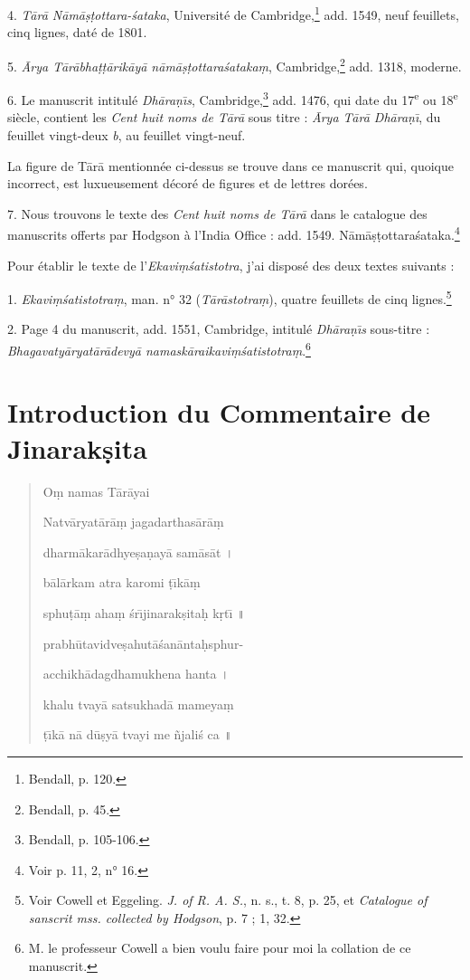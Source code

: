 \documentclass[a4paper, 11pt, oneside, french, landscape, twocolumn]{article}
\begin{document}
4. \emph{T\={a}r\={a} N\={a}m\={a}\d{s}\d{t}ottara-\'{s}ataka}, Université de Cambridge,\footnote{Bendall, p. 120.} add. 1549, neuf feuillets, cinq lignes, daté de 1801.

5. \emph{\={A}rya T\={a}r\={a}bha\d{t}\d{t}\={a}rik\={a}y\={a} n\={a}m\={a}\d{s}\d{t}ottara\'{s}ataka\d{m}}, Cambridge,\footnote{Bendall, p. 45.} add. 1318, moderne.

6. Le manuscrit intitulé \emph{Dh\={a}ra\d{n}\={\i}s}, Cambridge,\footnote{Bendall, p. 105-106.} add. 1476, qui date du 17\textsuperscript{e} ou 18\textsuperscript{e} siècle, contient les \emph{Cent huit noms de T\={a}r\={a}} sous titre : \emph{\={A}rya T\={a}r\={a} Dh\={a}ra\d{n}\={\i}}, du feuillet vingt-deux \emph{b}, au feuillet vingt-neuf.

La figure de T\={a}r\={a} mentionnée ci-dessus se trouve dans ce manuscrit qui, quoique incorrect, est luxueusement décoré de figures et de lettres dorées.

7. Nous trouvons le texte des \emph{Cent huit noms de T\={a}r\={a}} dans le catalogue des manuscrits offerts par Hodgson à l'India Office : add. 1549. N\={a}m\={a}\d{s}\d{t}ottara\'{s}ataka.\footnote{Voir p. 11, 2, n° 16.}

\bigskip

Pour établir le texte de l'\emph{Ekavi\d{m}\'{s}atistotra}, j'ai disposé des deux textes suivants :

1. \emph{Ekavi\d{m}\'{s}atistotra\d{m}}, man. n° 32 (\emph{T\={a}r\={a}stotra\d{m}}), quatre feuillets de cinq lignes.\footnote{Voir Cowell et Eggeling. \emph{J. of R. A. S.}, n. s., t. 8, p. 25, et \emph{Catalogue of sanscrit mss. collected by Hodgson}, p. 7 ; 1, 32.}

2. Page 4 du manuscrit, add. 1551, Cambridge, intitulé \emph{Dh\={a}ra\d{n}\={\i}s} sous-titre : \emph{Bhagavaty\={a}ryat\={a}r\={a}devy\={a} namask\={a}raikavi\d{m}\'{s}atistotra\d{m}}.\footnote{M. le professeur Cowell a bien voulu faire pour moi la collation de ce manuscrit.}
\clearpage
\section{Introduction du Commentaire de Jinarak\d{s}ita}
\begin{quotation}\footnotesize
O\d{m} namas T\={a}r\={a}yai

\bigskip

Natv\={a}ryat\={a}r\={a}\d{m} jagadarthas\={a}r\={a}\d{m}

dharm\={a}kar\={a}dhye\d{s}a\d{n}ay\={a} sam\={a}s\={a}t \texthindi{।}

b\={a}l\={a}rkam atra karomi \d{t}\={\i}k\={a}\d{m}

sphu\d{t}\={a}\d{m} aha\d{m} \'{s}r\={\i}jinarak\d{s}ita\d{h} k\d{r}t\={\i} \texthindi{॥}

\bigskip

prabh\={u}tavidve\d{s}ahut\={a}\'{s}an\={a}nta\d{h}sphur-

acchikh\={a}dagdhamukhena hanta \texthindi{।}

khalu tvay\={a} satsukhad\={a} mameya\d{m}

\d{t}\={\i}k\={a} n\={a} d\={u}\d{s}y\={a} tvayi me \~{n}jali\'{s} ca \texthindi{॥}
\end{quotation}
\end{document}
